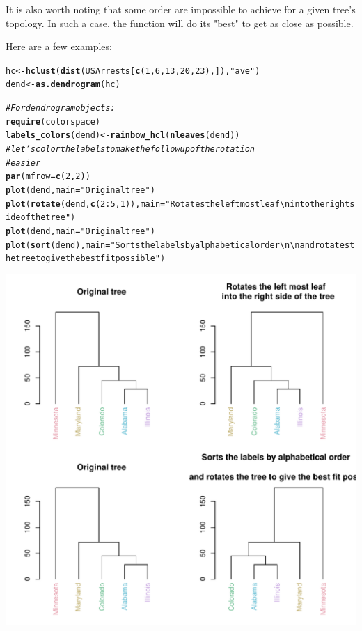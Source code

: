 \documentclass[shortnames,nojss,article]{jss}\usepackage[]{graphicx}\usepackage[]{color}
\makeatletter
\def\maxwidth{ %
  \ifdim\Gin@nat@width>\linewidth
    \linewidth
  \else
    \Gin@nat@width
  \fi
}
\newcommand{\hlnum}[1]{\textcolor[rgb]{0.686,0.059,0.569}{#1}}%
\newcommand{\hlstr}[1]{\textcolor[rgb]{0.192,0.494,0.8}{#1}}%
\newcommand{\hlcom}[1]{\textcolor[rgb]{0.678,0.584,0.686}{\textit{#1}}}%
\newcommand{\hlopt}[1]{\textcolor[rgb]{0,0,0}{#1}}%
\newcommand{\hlstd}[1]{\textcolor[rgb]{0.345,0.345,0.345}{#1}}%
\newcommand{\hlkwb}[1]{\textcolor[rgb]{0.69,0.353,0.396}{#1}}%
\newcommand{\hlkwc}[1]{\textcolor[rgb]{0.333,0.667,0.333}{#1}}%
\newcommand{\hlkwd}[1]{\textcolor[rgb]{0.737,0.353,0.396}{\textbf{#1}}}%
\newenvironment{kframe}{%
 \def\at@end@of@kframe{}%
 \ifinner\ifhmode%
  \def\at@end@of@kframe{\end{minipage}}%
  \begin{minipage}{\columnwidth}%
 \fi\fi%
 \def\FrameCommand##1{\hskip\@totalleftmargin \hskip-\fboxsep
 \colorbox{shadecolor}{##1}\hskip-\fboxsep
     \hskip-\linewidth \hskip-\@totalleftmargin \hskip\columnwidth}%
 \MakeFramed {\advance\hsize-\width
   \@totalleftmargin\z@ \linewidth\hsize
   \@setminipage}}%
 {\par\unskip\endMakeFramed%
 \at@end@of@kframe}
\newenvironment{knitrout}{}{} %
\makeatother
\begin{document}
It is also worth noting that some order are impossible to achieve for a given 
tree's topology. In such a case, the function will do its "best" to get as close
as possible.

Here are a few examples:


\begin{knitrout}
\color{fgcolor}\begin{kframe}
\begin{alltt}
\hlstd{hc} \hlkwb{<-} \hlkwd{hclust}\hlstd{(}\hlkwd{dist}\hlstd{(USArrests[}\hlkwd{c}\hlstd{(}\hlnum{1}\hlstd{,} \hlnum{6}\hlstd{,} \hlnum{13}\hlstd{,} \hlnum{20}\hlstd{,} \hlnum{23}\hlstd{), ]),} \hlstr{"ave"}\hlstd{)}
\hlstd{dend} \hlkwb{<-} \hlkwd{as.dendrogram}\hlstd{(hc}\hlstd{)}

\hlcom{# For dendrogram objects:}
\hlkwd{require}\hlstd{(colorspace)}
\hlkwd{labels_colors}\hlstd{(dend)} \hlkwb{<-} \hlkwd{rainbow_hcl}\hlstd{(}\hlkwd{nleaves}\hlstd{(dend))}
\hlcom{# let's color the labels to make the followup of the rotation}
\hlcom{# easier}
\hlkwd{par}\hlstd{(}\hlkwc{mfrow} \hlstd{=} \hlkwd{c}\hlstd{(}\hlnum{2}\hlstd{,} \hlnum{2}\hlstd{))}
\hlkwd{plot}\hlstd{(dend,} \hlkwc{main} \hlstd{=} \hlstr{"Original tree"}\hlstd{)}
\hlkwd{plot}\hlstd{(}\hlkwd{rotate}\hlstd{(dend,} \hlkwd{c}\hlstd{(}\hlnum{2}\hlopt{:}\hlnum{5}\hlstd{,} \hlnum{1}\hlstd{)),} \hlkwc{main} \hlstd{=} \hlstr{"Rotates the left most leaf \textbackslash{}n into the right side of the tree"}\hlstd{)}
\hlkwd{plot}\hlstd{(dend,} \hlkwc{main} \hlstd{=} \hlstr{"Original tree"}\hlstd{)}
\hlkwd{plot}\hlstd{(}\hlkwd{sort}\hlstd{(dend),} \hlkwc{main} \hlstd{=} \hlstr{"Sorts the labels by alphabetical order \textbackslash{}n \textbackslash{}n     and rotates the tree to give the best fit possible"}\hlstd{)}
\end{alltt}
\end{kframe}

{\centering \includegraphics[width=\maxwidth]{figure/unnamed-chunk-30} 

}
\end{knitrout}
\end{document}
